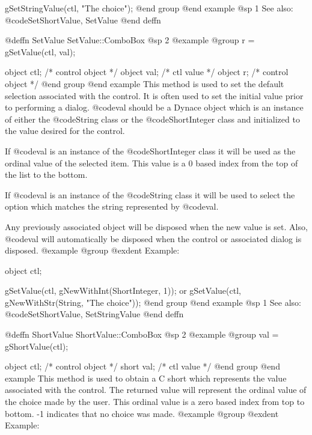 {gSetStringValue(ctl, "The choice");
@end group
@end example
@sp 1
See also:  @code{SetShortValue, SetValue}
@end deffn










@deffn {SetValue} SetValue::ComboBox
@sp 2
@example
@group
r = gSetValue(ctl, val);

object  ctl;    /*  control object  */
object  val;    /*  ctl value       */
object  r;      /*  control object  */
@end group
@end example
This method is used to set the default selection associated with the
control.  It is often used to set the initial value prior to performing
a dialog.  @code{val} should be a Dynace object which is an instance of
either the @code{String} class or the @code{ShortInteger} class and
initialized to the value desired for the control.

If @code{val} is an instance of the @code{ShortInteger} class it will be
used as the ordinal value of the selected item.  This value is a 0 based
index from the top of the list to the bottom.

If @code{val} is an instance of the @code{String} class it will be used
to select the option which matches the string represented by @code{val}.

Any previously associated object will be disposed when the new value is set.
Also, @code{val} will automatically be disposed when the control or associated
dialog is disposed.
@example
@group
@exdent Example:

object  ctl;

gSetValue(ctl, gNewWithInt(ShortInteger, 1));
        or
gSetValue(ctl, gNewWithStr(String, "The choice"));
@end group
@end example
@sp 1
See also:  @code{SetShortValue, SetStringValue}
@end deffn













@deffn {ShortValue} ShortValue::ComboBox
@sp 2
@example
@group
val = gShortValue(ctl);

object  ctl;   /*  control object  */
short   val;   /*  ctl value       */
@end group
@end example
This method is used to obtain a C short which represents the value
associated with the control.  The returned value will represent the
ordinal value of the choice made by the user.  This ordinal value is a
zero based index from top to bottom.  -1 indicates that no choice was
made.
@example
@group
@exdent Example:

}
